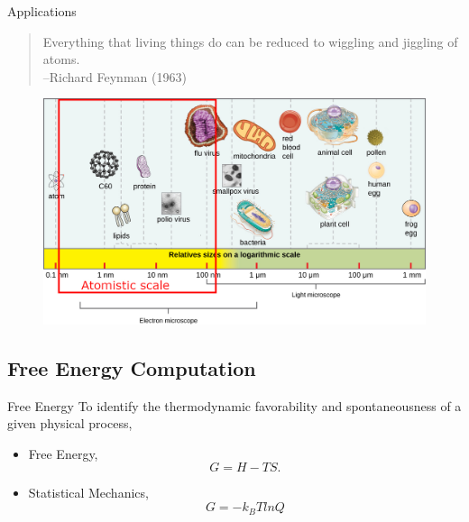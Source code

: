 \documentclass{beamer}
\begin{document}


\begin{frame}{Applications} 
\begin{quote}
	Everything that living things do can be reduced to wiggling and jiggling of atoms. 
	\\ \hfill --Richard Feynman (1963)
\end{quote}
\vspace{-.5cm}
\begin{figure}
	\includegraphics[width=.9\linewidth]{Pics/scale_comm.jpg}
\end{figure}
\end{frame}
	
\subsection{Free Energy Computation}
\begin{frame}{Free Energy}
To identify the thermodynamic favorability and spontaneousness of a given physical process, 
\vspace{1cm}
\begin{itemize}
	\item 
	Free Energy, 
	\begin{equation}
	G = H - TS. 
	\end{equation}

	\item Statistical Mechanics, 
	\begin{equation}
	G = - k_B T ln Q
	\end{equation}
\end{itemize}	

\end{frame}
\end{document}
